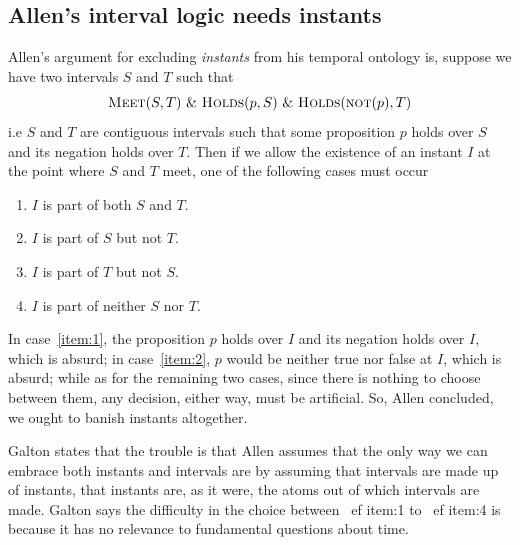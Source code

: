 \subsection{Allen's interval logic needs instants}
Allen's argument for excluding \textit{instants} from his temporal ontology is, suppose we have two intervals $S$ and $T$ such that
\[
	\textsc{Meet}(S, T) \  \& \  \textsc{Holds}(p, S) \ \&  \ \textsc{Holds}(\textsc{not}(p), T)
\]
i.e $S$ and $T$ are contiguous intervals such that some proposition $p$ holds over $S$ and its negation holds over $T$. Then if we allow the existence of an instant $I$ at the point where $S$ and $T$ meet, one of the following cases must occur
\begin{enumerate}[label=(\arabic*)]
	\item  $I$ is part of both $S$ and $T$.\label{item:1}
	\item  $I$ is part of $S$ but not $T$.\label{item:2}
	\item  $I$ is part of $T$ but not $S$. \label{item:3}
	\item  $I$ is part of neither $S$ nor $T$. \label{item:4}
\end{enumerate}
In case~\ref{item:1}, the proposition $p$ holds over $I$ and its negation holds over $I$, which is absurd;
in case~\ref{item:2}, $p$ would be neither true nor false at $I$, which is absurd;
while as for the remaining two cases, since there is nothing to choose between them, any decision, either way, must be artificial. So, Allen concluded, we ought to banish instants altogether.

Galton states that the trouble is that Allen assumes that the only way we can embrace both instants and
intervals are by assuming that intervals are made up of instants, that instants are, as it were, the atoms out of which intervals are made.
Galton says the difficulty in the choice between~ ef {item:1} to~ ef {item:4} is because it has no relevance to fundamental questions about time.

%
%
%
%

